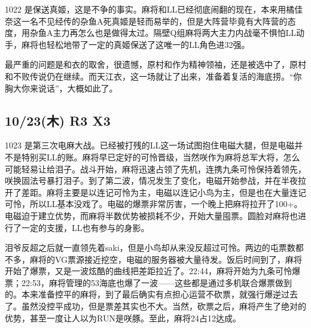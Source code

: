 1022 是保送真姬，这是不争的事实。麻将和LL已经彻底闹翻的现在，本来用橘佳奈这一名不见经传的杂鱼A死真姬是轻而易举的，但是大阵营毕竟有大阵营的态度，用杂鱼A主力再怎么也是做得太过。隔壁Q组麻将两大主力内战毫不惧怕LL动手，麻将也轻松地带了一定的真姬保送了这唯一的LL角色进32强。

最严重的问题是和衣的取舍，很遗憾，原村和作为精神领袖，还是被选中了，原村和不败传说仍在继续。而天江衣，这一场就让了出来，准备着复活的海底捞。“你胸大你来说话”，大概如此了。

\subsection{10/23(木) R3 X3}


1023 是第三次电麻大战。已经被打残的LL这一场试图抱住电磁大腿，但是电磁并不是特别买LL的账。麻将早已定好的可怜晋级，当然咲作为麻将总军大将，怎么可能轻易让给泪子。战斗开始，麻将迅速占领了先机，连携九条可怜保持着领先，咲换固法号暴打泪子。到了第二波，情况发生了变化，电磁开始参战，并在半夜拉开了差距。麻将主要是以连记可怜为主，电磁以连记小鸟为主，但是也在大量连记可怜，所以LL基本没戏了。电磁的爆票非常厉害，一个晚上把麻将拉开了100+。电磁迫于建立优势，而麻将半数优势被损耗不少，开始大量囤票。圆脸对麻将也进行了一定的支援，LL也有参与的身影。

泪爷反超之后就一直领先着saki，但是小鸟却从来没反超过可怜。两边的屯票数都不多，麻将的VG票源接近挖空，电磁的服务器被大量待发。饭后时间到了，麻将开始了爆票，又是一波炫酷的曲线把差距拉近了。22:44，麻将开始为九条可怜爆票；22:53，麻将管理的53海底也爆了一波——这些都是通过多机联合爆票做到的。本来准备控平的麻将，到了最后确实有点担心运营不砍票，就强行爆逆过去了。虽然没控平成功，但是票差其实也不大。当然，砍票之后，麻将产生了绝对的优势，甚至一度让人以为RUN是咲豚。至此，麻将24占12达成。

